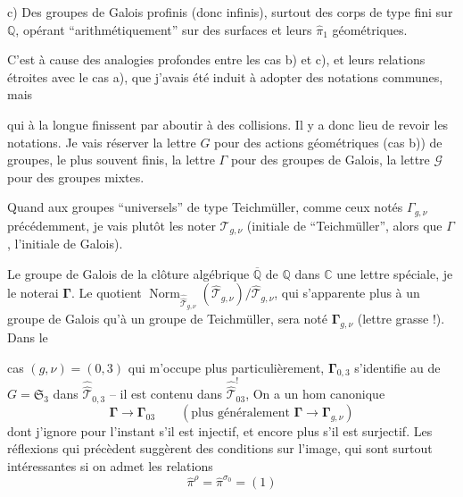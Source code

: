 c) Des groupes de Galois profinis (donc infinis), surtout des corps de type fini sur $\mathbb Q$, opérant ``arithmétiquement'' sur des surfaces et leurs $\widehat{\pi}_1$ géométriques.

C'est à cause des analogies profondes entre les cas b) et c), et leurs relations étroites avec le cas a), que j'avais été induit à adopter des notations communes, mais


qui à la longue finissent par aboutir à des collisions. Il y a donc lieu de revoir les notations. Je vais réserver la lettre $G$  pour des actions géométriques (cas b)) de groupes, le plus souvent finis, la lettre $\Gamma$  pour des groupes de Galois, la lettre $\mathcal G$ pour des groupes mixtes.

Quand aux groupes ``universels'' de type Teichmüller, comme ceux notés $\Gamma_{g,\nu}$ précédemment, je vais plutôt les noter  $\mathcal T_{g,\nu}$ (initiale de ``Teichmüller'', alors que $\Gamma$,   l'initiale de Galois).

Le groupe de Galois  de la clôture algébrique $\overline{\mathbb Q}$ de $\mathbb Q$ dans $\mathbb C$   une lettre spéciale, je le noterai $\boldsymbol{\Gamma}$. Le quotient  $\operatorname{Norm}_{\widehat{\widehat{\mathcal T}}_{g,\nu}}(\widehat{\mathcal T}_{g,\nu})/\widehat{\mathcal T}_{g,\nu}$, qui s'apparente plus à un groupe de Galois qu'à un groupe de Teichmüller, sera noté $\boldsymbol{\Gamma}_{g,\nu}$ (lettre grasse !). Dans le


cas $(g,\nu)=(0,3)$ qui m'occupe plus particulièrement, $\boldsymbol{\Gamma}_{0,3}$ s'identifie au   de $G=\mathfrak S_3$  dans $\widehat{\widehat{\mathcal T}}_{0,3}$ -- il est contenu dans $\widehat{\widehat{\mathcal T}}_{03}^{!}$,  On a un hom canonique
\[
\boldsymbol{\Gamma}\longrightarrow\boldsymbol{\Gamma}_{03}
\qquad (\text{plus généralement }\boldsymbol{\Gamma}\longrightarrow\boldsymbol{\Gamma}_{g,\nu})
\]
dont j'ignore pour l'instant s'il est injectif, et encore plus s'il est surjectif. Les réflexions qui précèdent suggèrent des conditions sur l'image, qui sont surtout intéressantes si on admet les relations
\[
\widehat{\pi}^{\rho}=\widehat{\pi}^{\sigma_0}=(1)
\]

